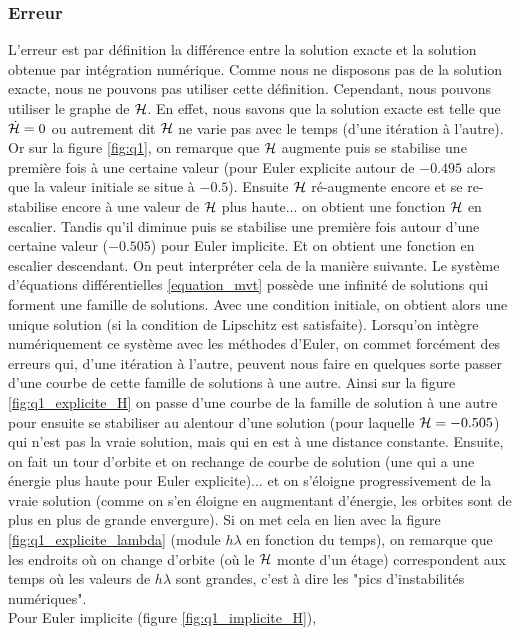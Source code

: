 \subsubsection{Erreur}
L'erreur est par définition la différence entre la solution exacte et la solution obtenue par intégration numérique.
Comme nous ne disposons pas de la solution exacte, nous ne pouvons pas utiliser cette définition. Cependant, nous pouvons utiliser le graphe de $\mathcal{H}$.
En effet, nous savons que la solution exacte est telle que $\dot{\mathcal{H}} = 0$ ou autrement dit $\mathcal{H}$ ne varie pas avec le temps (d'une itération à l'autre).
Or sur la figure \ref{fig:q1}, on remarque que $\mathcal{H}$ augmente puis se stabilise une première fois à une certaine valeur (pour Euler explicite autour de $-0.495$ alors que la valeur initiale se situe à $-0.5$). Ensuite $\mathcal{H}$ ré-augmente encore et se re-stabilise encore à une valeur de $\mathcal{H}$ plus haute... on obtient une fonction $\mathcal{H}$ en escalier. Tandis qu'il diminue puis se stabilise une première fois autour d'une certaine valeur ($-0.505$) pour Euler implicite. Et on obtient une fonction en escalier descendant.
On peut interpréter cela de la manière suivante.
Le système d'équations différentielles \ref{equation_mvt} possède une infinité de solutions qui forment une famille de solutions.
Avec une condition initiale, on obtient alors une unique solution (si la condition de Lipschitz est satisfaite).
Lorsqu'on intègre numériquement ce système avec les méthodes d'Euler,
on commet forcément des erreurs qui, d'une itération à l'autre, peuvent
nous faire en quelques sorte passer d'une courbe de cette famille de solutions à une autre.
Ainsi sur la figure \ref{fig:q1_explicite_H} on passe d'une courbe de la famille de solution à une autre pour ensuite se stabiliser au alentour d'une solution (pour laquelle $\mathcal{H}=-0.505$) qui n'est pas la vraie solution,
mais qui en est à une distance constante. Ensuite, on fait un tour d'orbite et on rechange de courbe de solution (une qui a une énergie plus haute pour Euler explicite)... et on s'éloigne progressivement de la vraie solution (comme on s'en éloigne en augmentant d'énergie, les orbites sont de plus en plus de grande envergure). Si on met cela en lien avec la figure \ref{fig:q1_explicite_lambda} (module $h\lambda$ en fonction du temps), on remarque que les endroits où on change d'orbite (où le $\mathcal{H}$ monte d'un étage) correspondent aux temps où les valeurs de $h \lambda $ sont grandes, c'est à dire les "pics d'instabilités numériques". \\
Pour Euler implicite (figure \ref{fig:q1_implicite_H}),
